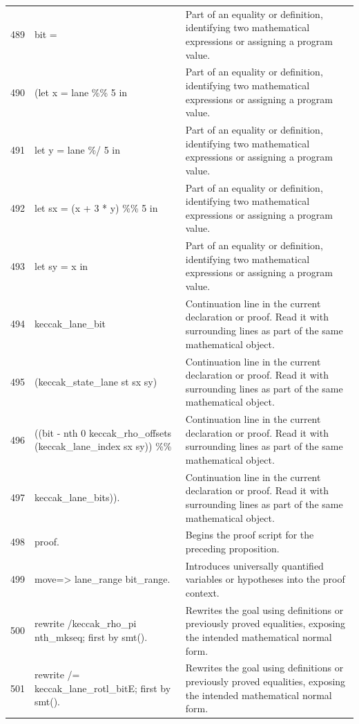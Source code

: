 \documentclass[10pt]{article}
\begin{document}
\begin{longtable}{r L{0.53\textwidth} L{0.37\textwidth}}
489 & {\ttfamily\scriptsize     bit =} & Part of an equality or definition, identifying two mathematical expressions or assigning a program value. \\
490 & {\ttfamily\scriptsize   (let x = lane \%\% 5 in} & Part of an equality or definition, identifying two mathematical expressions or assigning a program value. \\
491 & {\ttfamily\scriptsize    let y = lane \%/ 5 in} & Part of an equality or definition, identifying two mathematical expressions or assigning a program value. \\
492 & {\ttfamily\scriptsize    let sx = (x + 3 * y) \%\% 5 in} & Part of an equality or definition, identifying two mathematical expressions or assigning a program value. \\
493 & {\ttfamily\scriptsize    let sy = x in} & Part of an equality or definition, identifying two mathematical expressions or assigning a program value. \\
494 & {\ttfamily\scriptsize    keccak\_lane\_bit} & Continuation line in the current declaration or proof.  Read it with surrounding lines as part of the same mathematical object. \\
495 & {\ttfamily\scriptsize      (keccak\_state\_lane st sx sy)} & Continuation line in the current declaration or proof.  Read it with surrounding lines as part of the same mathematical object. \\
496 & {\ttfamily\scriptsize      ((bit - nth 0 keccak\_rho\_offsets (keccak\_lane\_index sx sy)) \%\%} & Continuation line in the current declaration or proof.  Read it with surrounding lines as part of the same mathematical object. \\
497 & {\ttfamily\scriptsize       keccak\_lane\_bits)).} & Continuation line in the current declaration or proof.  Read it with surrounding lines as part of the same mathematical object. \\
498 & {\ttfamily\scriptsize proof.} & Begins the proof script for the preceding proposition. \\
499 & {\ttfamily\scriptsize move=> lane\_range bit\_range.} & Introduces universally quantified variables or hypotheses into the proof context. \\
500 & {\ttfamily\scriptsize rewrite /keccak\_rho\_pi nth\_mkseq; first by smt().} & Rewrites the goal using definitions or previously proved equalities, exposing the intended mathematical normal form. \\
501 & {\ttfamily\scriptsize rewrite /= keccak\_lane\_rotl\_bitE; first by smt().} & Rewrites the goal using definitions or previously proved equalities, exposing the intended mathematical normal form. \\

\end{longtable}
\end{document}
